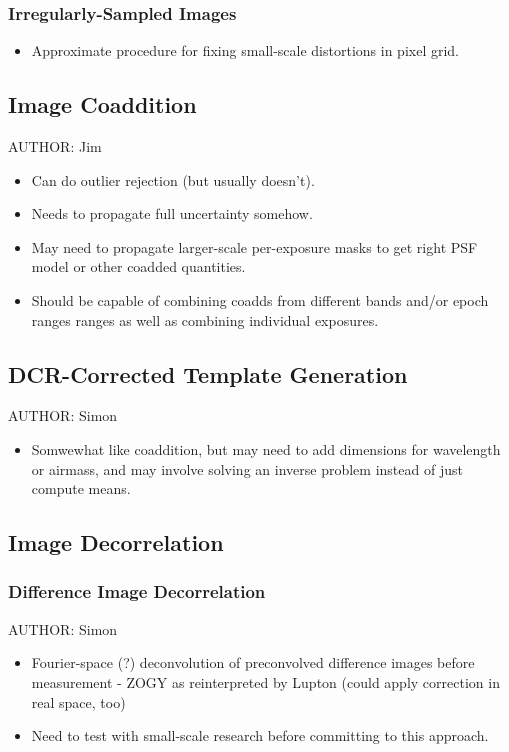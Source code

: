 \subsubsection{Irregularly-Sampled Images}
\begin{itemize}
\item Approximate procedure for fixing small-scale distortions in pixel grid.
\end{itemize}

\subsection{Image Coaddition}
AUTHOR: Jim
\begin{itemize}
\item Can do outlier rejection (but usually doesn't).
\item Needs to propagate full uncertainty somehow.
\item May need to propagate larger-scale per-exposure masks to get right PSF model or other coadded quantities.
\item Should be capable of combining coadds from different bands and/or epoch ranges ranges as well as combining individual exposures.
\end{itemize}

\subsection{DCR-Corrected Template Generation}
AUTHOR: Simon
\begin{itemize}
\item Somwewhat like coaddition, but may need to add dimensions for wavelength or airmass, and may involve solving an inverse problem instead of just compute means.
\end{itemize}

\subsection{Image Decorrelation}
\subsubsection{Difference Image Decorrelation}
AUTHOR: Simon
\begin{itemize}
\item Fourier-space (?) deconvolution of preconvolved difference images before measurement - ZOGY as reinterpreted by Lupton (could apply correction in real space, too)
\item Need to test with small-scale research before committing to this approach.
\end{itemize}


